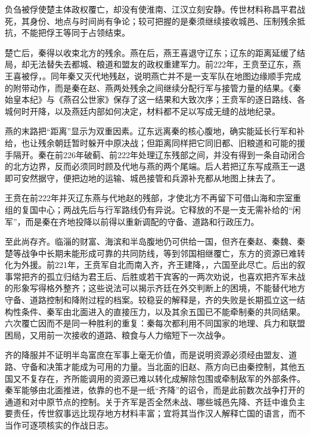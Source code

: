 负刍被俘使楚主体政权覆亡，却没有使淮南、江汉立刻安静。传世材料称昌平君战死，其身份、地点与时间尚有争论；较可把握的是秦须继续接收城邑、压制残余抵抗，不能把俘王等同于占领结束。

楚亡后，秦得以收束北方的残余。燕在后，燕王喜退守辽东；辽东的距离延缓了结局，却无法替失去都城、粮道和盟友的政权重建军力。前222年，王贲至辽东，燕王喜被俘，。同年秦又灭代地残赵，说明燕亡并不是一支军队在地图边缘顺手完成的附带动作，而是秦在赵、燕两处残余之间继续分配行军与接管力量的结果。《秦始皇本纪》与《燕召公世家》保存了这一结果和大致次序；王贲军的逐日路线、各城何时开降，以及燕廷内部如何决定，材料都不足以写成无缝的战地纪录。

燕的末路把“距离”显示为双重因素。辽东远离秦的核心腹地，确实能延长行军和补给，也让残余朝廷暂时躲开中原决战；但距离同样把它同旧都、旧粮道和可能的援手隔开。秦在前226年破蓟、前222年处理辽东残部之间，并没有得到一条自动闭合的北方边界，反而必须同时顾及代地与燕的两个尾端。后人若把辽东写成燕王一退即可安然据守，便把边地的运输、城邑接管和兵源补充都从地图上抹去了。

王贲在前222年并灭辽东燕与代地赵的残部，才使北方不再留下可借山海和宗室重组的复国中心；两战先后与行军路线仍有异说。它释放的不是一支无需补给的“闲军”，而是秦在齐地投降以前得以重新调配的守备、道路和行政压力。

至此尚存齐。临淄的财富、海滨和半岛腹地仍可供给一国，但齐在秦赵、秦魏、秦楚等战争中长期未能形成可靠的共同防线，等到邻国相继覆亡，东方的资源已难转化为外援。前221年，王贲军自北而南入齐，齐王建降，，六国至此尽亡。后出的叙事常把齐的孤立归结为君王后、后胜或若干宾客的一两次劝说，也喜欢把齐军未战的形象写得格外整齐；这些说法可以揭示齐廷在外交判断上的困境，不能替代地方守备、道路控制和降附过程的档案。较稳妥的解释是，齐的失败是长期孤立这一结构性条件、秦军由北面进入的直接压力，以及其余五国已不能牵制秦的共同结果。六次覆亡因而不是同一种胜利的重复：秦每次都利用不同国家的地理、兵力和联盟困局，又用前一次接收的道路、粮食与人力缩短下一次战争。

齐的降服并不证明半岛富庶在军事上毫无价值，而是说明资源必须经由盟友、道路、守备和决策才能成为可用的力量。当北面的旧赵、燕方向已由秦控制，其他五国又不复存在，齐所能调用的资源已难以转化成解除包围或牵制敌军的外部条件。秦军能够由北面推进，依靠的也不是一纸“齐降”的诏令，而是此前数次战争打开的通道和对中原节点的控制。关于齐军是否全然未战、哪些城邑先降、齐廷中谁负主要责任，传世叙事远比现存地方材料丰富；宜将其当作汉人解释亡国的语言，而不当作可逐项核实的作战日志。

